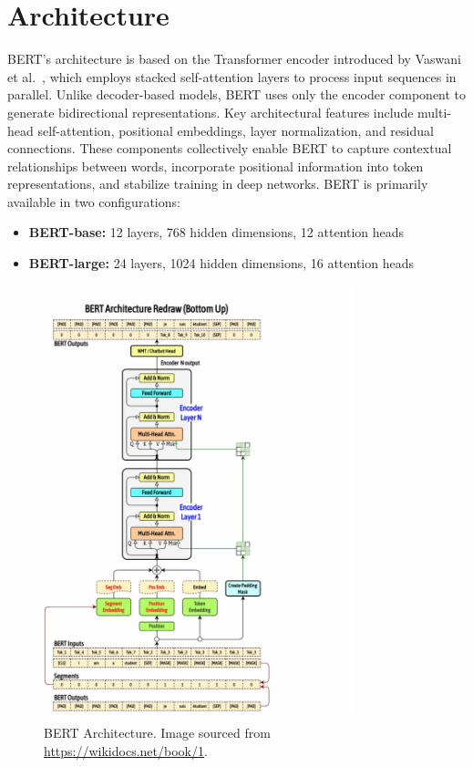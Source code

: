 \section{Architecture}
BERT's architecture is based on the Transformer encoder introduced by Vaswani et al.~\cite{vaswani2017attention}, which employs stacked self-attention layers to process input sequences in parallel. Unlike decoder-based models, BERT uses only the encoder component to generate bidirectional representations.
Key architectural features include multi-head self-attention, positional embeddings, layer normalization, and residual connections. These components collectively enable BERT to capture contextual relationships between words, incorporate positional information into token representations, and stabilize training in deep networks.
BERT is primarily available in two configurations:
\begin{itemize}
    \item \textbf{BERT-base:} 12 layers, 768 hidden dimensions, 12 attention heads
    \item \textbf{BERT-large:} 24 layers, 1024 hidden dimensions, 16 attention heads
\end{itemize}
\begin{figure}[H]
\centering
\includegraphics[width=90mm]{Figures/BERT.jpg}
\caption{BERT Architecture. Image sourced from \url{https://wikidocs.net/book/1}.\label{4}}
\end{figure}

